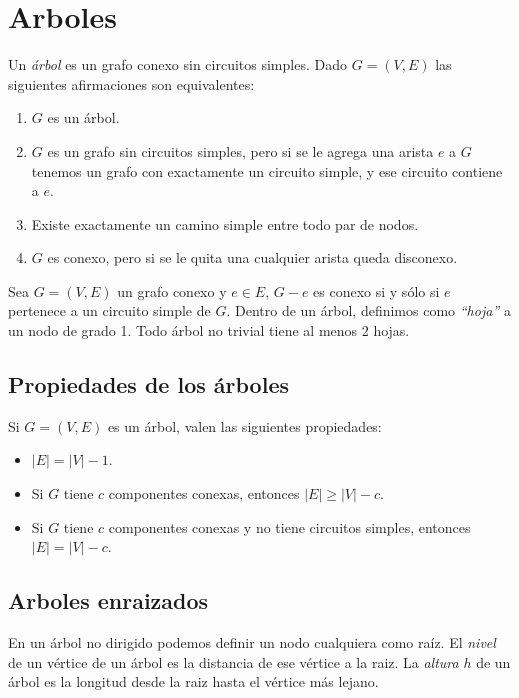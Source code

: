 \newpage
\section{Arboles}

Un \emph{\'arbol} es un grafo conexo sin circuitos simples. Dado $G=(V,E)$ las siguientes afirmaciones son equivalentes:

\begin{enumerate}
\item $G$ es un \'arbol.
\item $G$ es un grafo sin circuitos simples, pero si se le agrega una arista $e$ a $G$ tenemos un grafo con exactamente un circuito simple, y ese circuito contiene a $e$.
\item Existe exactamente un camino simple entre todo par de nodos.
\item $G$ es conexo, pero si se le quita una cualquier arista queda disconexo.
\end{enumerate}

Sea $G=(V,E)$ un grafo conexo y $e \in E$, $G-e$ es conexo si y s\'olo si $e$ pertenece a un circuito simple de $G$. Dentro de un \'arbol, definimos como \emph{``hoja''} a un nodo de grado 1. Todo \'arbol no trivial tiene al menos 2 hojas.

\subsection{Propiedades de los \'arboles}

Si $G = (V,E)$ es un \'arbol, valen las siguientes propiedades:

\begin{itemize}
\item $|E| = |V| - 1$.
\item Si $G$ tiene $c$ componentes conexas, entonces $|E| \geq |V| - c$.
\item Si $G$ tiene $c$ componentes conexas y no tiene circuitos simples, entonces $|E| =|V|-c$.
\end{itemize}

\subsection{Arboles enraizados}

En un \'arbol no dirigido podemos definir un nodo cualquiera como ra\'iz. El \emph{nivel} de un v\'ertice de un \'arbol es la distancia de ese v\'ertice a la raiz. La \emph{altura} $h$ de un \'arbol es la longitud desde la raiz hasta el v\'ertice m\'as lejano. 

